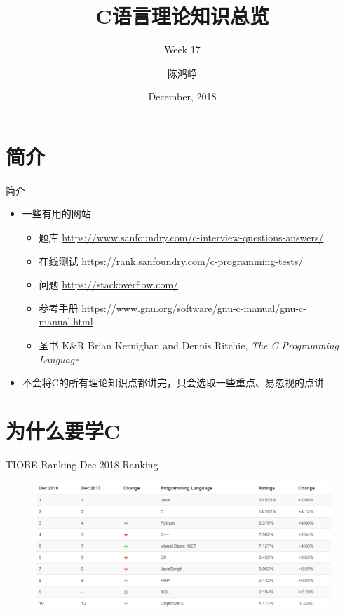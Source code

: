 \documentclass[UTF8]{ctexbeamer}
\title{C语言理论知识总览}
\subtitle{Week 17}
\author[chhzh123]{陈鸿峥}
\date[Dec, 2018]{December, 2018}
\begin{document}
\begin{frame}
\titlepage
\end{frame}

\begin{frame}
\tableofcontents[subsectionstyle=show]
\end{frame}

\section{简介}
\begin{frame}
\sectionpage
\end{frame}

\begin{frame}{简介}
\begin{itemize}
	\item 一些有用的网站
		\begin{itemize}
			\item 题库 \url{https://www.sanfoundry.com/c-interview-questions-answers/}
			\item 在线测试 \url{https://rank.sanfoundry.com/c-programming-tests/}
			\item 问题 \url{https://stackoverflow.com/}
			\item 参考手册 \url{https://www.gnu.org/software/gnu-c-manual/gnu-c-manual.html}
			\item 圣书 K\&R Brian Kernighan and Dennis Ritchie, \emph{The C Programming Language}
		\end{itemize}
	\item 不会将C的所有理论知识点都讲完，只会选取一些重点、易忽视的点讲
\end{itemize}
\end{frame}

\section{为什么要学C}
\begin{frame}
\sectionpage
\end{frame}

\begin{frame}{TIOBE Ranking}
Dec 2018 Ranking
\begin{figure}
\centering
\includegraphics[width=\linewidth]{fig/TIOBE.PNG}
\end{figure}
\end{frame}
\end{document}
